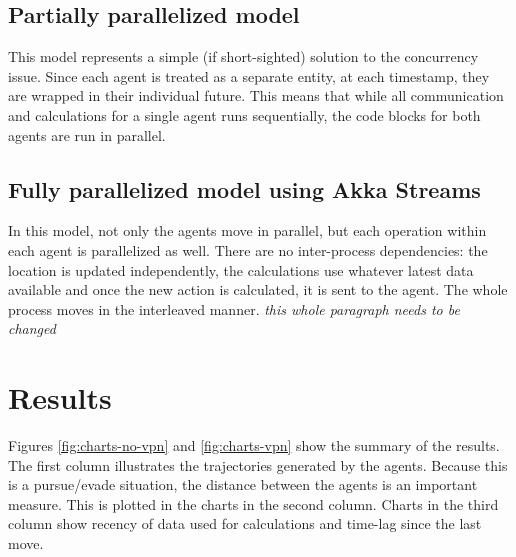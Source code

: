 \documentclass{article}
\begin{document}
\subsection{Partially parallelized model}
This model represents a simple (if short-sighted) solution to the concurrency issue. Since each agent is treated as a separate entity, at each timestamp, they are wrapped in their individual future. This means that while all communication and calculations for a single agent runs sequentially, the code blocks for both agents are run in parallel.

\subsection{Fully parallelized model using Akka Streams}
In this model, not only the agents move in parallel, but each operation within each agent is parallelized as well. There are no inter-process dependencies: the location is updated independently, the calculations use whatever latest data available and once the new action is calculated, it is sent to the agent. The whole process moves in the interleaved manner. \emph{this whole paragraph needs to be changed}


\section{Results}
Figures \ref{fig:charts-no-vpn} and \ref{fig:charts-vpn} show the summary of the results.  The first column illustrates the trajectories generated by the agents. Because this is a pursue/evade situation, the distance between the agents is an important measure. This is plotted in the charts in the second column.
Charts in the third column show recency of data used for calculations and time-lag since the last move.
\end{document}
